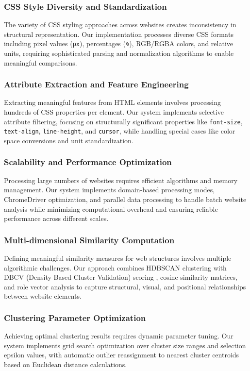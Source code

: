 \subsubsection{CSS Style Diversity and Standardization}
\label{subsec:css-diversity}
The variety of CSS styling approaches across websites creates inconsistency in structural representation. Our implementation processes diverse CSS formats including pixel values (\texttt{px}), percentages (\texttt{\%}), RGB/RGBA colors, and relative units, requiring sophisticated parsing and normalization algorithms to enable meaningful comparisons.

\subsubsection{Attribute Extraction and Feature Engineering}
\label{subsec:attribute-extraction}
Extracting meaningful features from HTML elements involves processing hundreds of CSS properties per element. Our system implements selective attribute filtering, focusing on structurally significant properties like \texttt{font-size}, \texttt{text-align}, \texttt{line-height}, and \texttt{cursor}, while handling special cases like color space conversions and unit standardization.

\subsubsection{Scalability and Performance Optimization}
\label{subsec:scalability}
Processing large numbers of websites requires efficient algorithms and memory management. Our system implements domain-based processing modes, ChromeDriver optimization, and parallel data processing to handle batch website analysis while minimizing computational overhead and ensuring reliable performance across different scales.

\subsubsection{Multi-dimensional Similarity Computation}
\label{subsec:multi-similarity}
Defining meaningful similarity measures for web structures involves multiple algorithmic challenges. Our approach combines HDBSCAN clustering with DBCV (Density-Based Cluster Validation) scoring \cite{moulavi2014dbcv}, cosine similarity matrices, and role vector analysis to capture structural, visual, and positional relationships between website elements.

\subsubsection{Clustering Parameter Optimization}
\label{subsec:clustering-optimization}
Achieving optimal clustering results requires dynamic parameter tuning. Our system implements grid search optimization over cluster size ranges and selection epsilon values, with automatic outlier reassignment to nearest cluster centroids based on Euclidean distance calculations.

